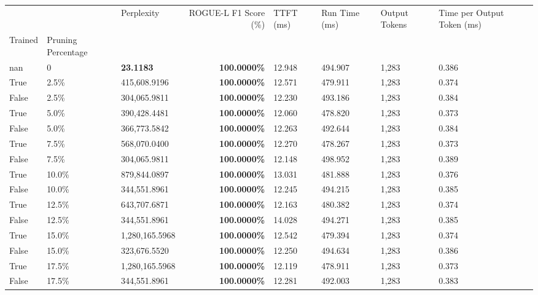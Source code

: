 \begin{table}[H]
\label{tab:evaluation-pipeline-13}
\begin{tabular}{lllrllll}
\toprule
 &  & Perplexity & ROGUE-L F1 Score (\%) & TTFT (ms) & Run Time (ms) & Output Tokens & Time per Output Token (ms) \\
Trained & Pruning Percentage &  &  &  &  &  &  \\
\midrule
nan & 0 & \bfseries 23.1183 & \bfseries 100.0000\% & 12.948 & 494.907 & 1,283 & 0.386 \\
\cline{1-8}
True & 2.5\% & 415,608.9196 & \bfseries \color{red} 100.0000\% & 12.571 & 479.911 & 1,283 & 0.374 \\
\cline{1-8}
False & 2.5\% & \color{red} 304,065.9811 & \bfseries \color{red} 100.0000\% & 12.230 & 493.186 & 1,283 & 0.384 \\
\cline{1-8}
True & 5.0\% & 390,428.4481 & \bfseries \color{red} 100.0000\% & 12.060 & 478.820 & 1,283 & 0.373 \\
\cline{1-8}
False & 5.0\% & 366,773.5842 & \bfseries \color{red} 100.0000\% & 12.263 & 492.644 & 1,283 & 0.384 \\
\cline{1-8}
True & 7.5\% & 568,070.0400 & \bfseries \color{red} 100.0000\% & 12.270 & 478.267 & 1,283 & 0.373 \\
\cline{1-8}
False & 7.5\% & \color{red} 304,065.9811 & \bfseries \color{red} 100.0000\% & 12.148 & 498.952 & 1,283 & 0.389 \\
\cline{1-8}
True & 10.0\% & 879,844.0897 & \bfseries \color{red} 100.0000\% & 13.031 & 481.888 & 1,283 & 0.376 \\
\cline{1-8}
False & 10.0\% & 344,551.8961 & \bfseries \color{red} 100.0000\% & 12.245 & 494.215 & 1,283 & 0.385 \\
\cline{1-8}
True & 12.5\% & 643,707.6871 & \bfseries \color{red} 100.0000\% & 12.163 & 480.382 & 1,283 & 0.374 \\
\cline{1-8}
False & 12.5\% & 344,551.8961 & \bfseries \color{red} 100.0000\% & 14.028 & 494.271 & 1,283 & 0.385 \\
\cline{1-8}
True & 15.0\% & 1,280,165.5968 & \bfseries \color{red} 100.0000\% & 12.542 & 479.394 & 1,283 & 0.374 \\
\cline{1-8}
False & 15.0\% & 323,676.5520 & \bfseries \color{red} 100.0000\% & 12.250 & 494.634 & 1,283 & 0.386 \\
\cline{1-8}
True & 17.5\% & 1,280,165.5968 & \bfseries \color{red} 100.0000\% & 12.119 & 478.911 & 1,283 & 0.373 \\
\cline{1-8}
False & 17.5\% & 344,551.8961 & \bfseries \color{red} 100.0000\% & 12.281 & 492.003 & 1,283 & 0.383 \\

\end{tabular}
\end{table}
